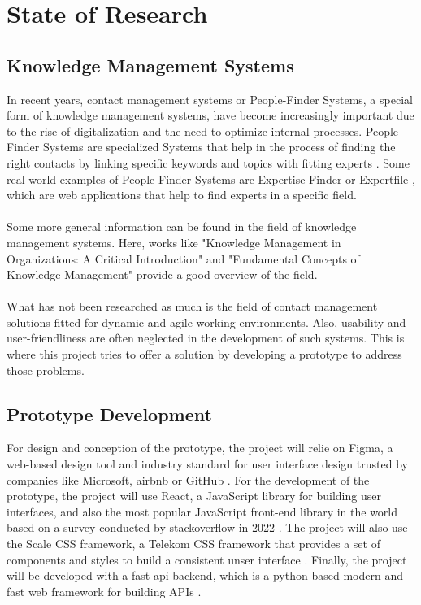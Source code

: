 \newpage
\section{State of Research} 

\subsection{Knowledge Management Systems}

In recent years, contact management systems or People-Finder Systems, a special form of knowledge management systems, have become increasingly 
important due to the rise of digitalization and the need to optimize internal processes. People-Finder Systems are specialized 
Systems that help in the process of finding the right contacts by linking specific keywords and topics with fitting experts \cite{becerra-fernandez_facilitating_nodate}.
Some real-world examples of People-Finder Systems are Expertise Finder \cite{noauthor_expertise_nodate} or Expertfile \cite{noauthor_expertfile_nodate}, which are web 
applications that help to find experts in a specific field.\\ \\
Some more general information can be found in the field of knowledge management systems. Here, works like "Knowledge Management in Organizations: A Critical Introduction" \cite{hislop2018knowledge} and "Fundamental Concepts of Knowledge Management" \cite{Schneider2009} 
provide a good overview of the field.\\ \\
What has not been researched as much is the field of contact management solutions fitted for dynamic and agile working environments. Also, usability and user-friendliness are often neglected in the development of such systems.
This is where this project tries to offer a solution by developing a prototype to address those problems.\\

\subsection{Prototype Development}

For design and conception of the prototype, the project will relie on Figma, a web-based design tool and industry standard for user interface design trusted by 
companies like Microsoft, airbnb or GitHub \cite{noauthor_figma_nodate}.
For the development of the prototype, the project will use React, a JavaScript library for building user interfaces, and also the most popular JavaScript front-end library in the world based on a survey conducted by stackoverflow in 2022 \cite{noauthor_stack_nodate}.
The project will also use the Scale CSS framework, a Telekom CSS framework that provides a set of components and styles to build a consistent unser interface \cite{noauthor_scale_nodate}.
Finally, the project will be developed with a fast-api backend, which is a python based modern and fast web framework for building APIs \cite{noauthor_fastapi_nodate}.
